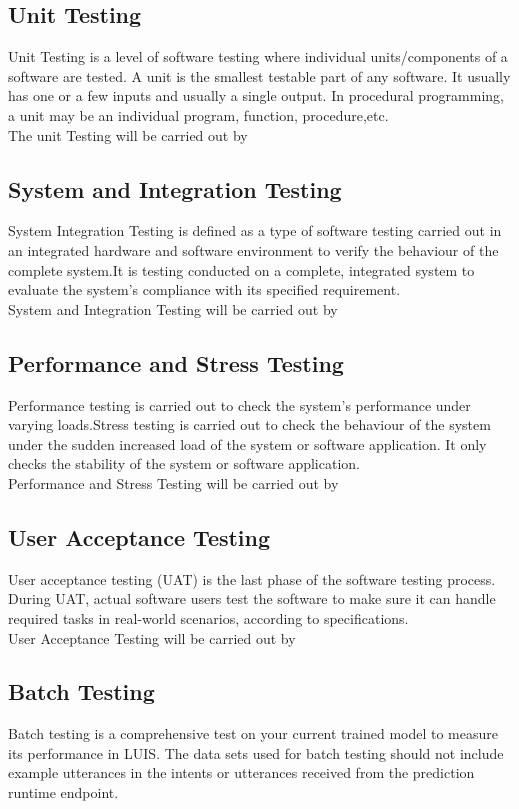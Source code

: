 \subsection{Unit Testing}
Unit Testing is a level of software testing where individual units/components of a software are tested. A unit is the smallest testable part of any software. It usually has one or a few inputs and usually a single output. In procedural programming, a unit may be an individual program, function, procedure,etc.	\\
The unit Testing will be carried out by

\subsection{System and Integration Testing}
System Integration Testing is defined as a type of software testing carried out in an integrated hardware and software environment to verify the behaviour of the complete system.It is testing conducted on a complete, integrated system to evaluate the system's compliance with its specified requirement.\\

System  and Integration Testing will be carried out by 

\subsection{Performance and Stress Testing}
Performance testing is carried out to check the system's performance under varying loads.Stress testing is carried out to check the behaviour of the system under the sudden increased load of the system or software application. It only checks the stability of the system or software application.\\


Performance and Stress Testing will be carried out by 


\subsection{User Acceptance Testing}
User acceptance testing (UAT) is the last phase of the software testing process. During UAT, actual software users test the software to make sure it can handle required tasks in real-world scenarios, according to specifications.\\


User Acceptance Testing will be carried out by 


\subsection{Batch Testing}
Batch testing is a comprehensive test on your current trained model to measure its performance in LUIS. The data sets used for batch testing should not include example utterances in the intents or utterances received from the prediction runtime endpoint.\\



